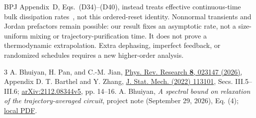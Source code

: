 \documentclass[aps,prb,twocolumn,10pt,raggedbottom,nofootinbib,superscriptaddress]{revtex4-2}
\begin{document}
BPJ Appendix~D, Eqs.~(D34)--(D40), instead treats effective
continuous-time bulk dissipation rates~\cite{BPJ}, not this ordered-reset
identity. Nonnormal transients and Jordan prefactors remain possible:
our result fixes an asymptotic rate, not a size-uniform mixing or
trajectory-purification time. It does not prove a thermodynamic
extrapolation. Extra dephasing, imperfect feedback, or randomized
schedules requires a new higher-order analysis.

\begin{thebibliography}{3}
A. Bhuiyan, H. Pan, and C.-M. Jian,
\href{https://doi.org/10.1103/nk38-ygyq}{Phys. Rev. Research \textbf{8}, 023147 (2026)},
Appendix D.
T. Barthel and Y. Zhang,
\href{https://doi.org/10.1088/1742-5468/ac8e5c}{J. Stat. Mech. (2022) 113101},
Secs. III.5--III.6;
\href{https://arxiv.org/pdf/2112.08344}{arXiv:2112.08344v5}, pp. 14--16.
A. Bhuiyan, \textit{A spectral bound on relaxation of the
trajectory-averaged circuit}, project note (September 29, 2026), Eq. (4);
\href{../../../matched_markov_lindblad_campaign/spectral_gap_v1/results/20260929T191448Z/analysis/gap_note.pdf}{local PDF}.
\end{thebibliography}
\end{document}

